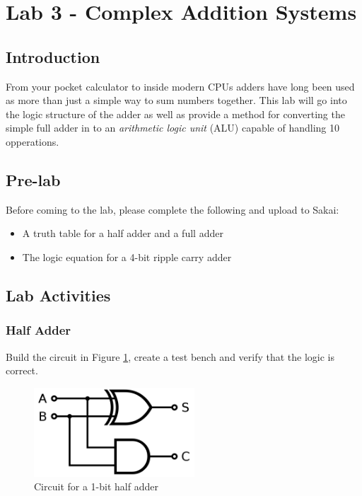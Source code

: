 \section{Lab 3 - Complex Addition Systems}

\subsection{Introduction}
From your pocket calculator to inside modern CPUs adders have long been used as more than just a simple way to sum numbers together. This lab will go into the logic structure of the adder as well as provide a method for converting the simple full adder in to an \emph{arithmetic logic unit} (ALU) capable of handling 10 opperations. 

\subsection{Pre-lab}
Before coming to the lab, please complete the following and upload to Sakai:
\begin{itemize}
	\item A truth table for a half adder and a full adder
	\item The logic equation for a 4-bit ripple carry adder
\end{itemize}

\subsection{Lab Activities}

\subsubsection{Half Adder}
Build the circuit in Figure \ref{fig:halfadder}, create a test bench and verify that the logic is correct.

\begin{figure}[H]
	\centering
	\includegraphics[width=60mm]{Lab3/figures/halfadder.png}
	\caption{Circuit for a 1-bit half adder}
	\label{fig:halfadder}
\end{figure}

